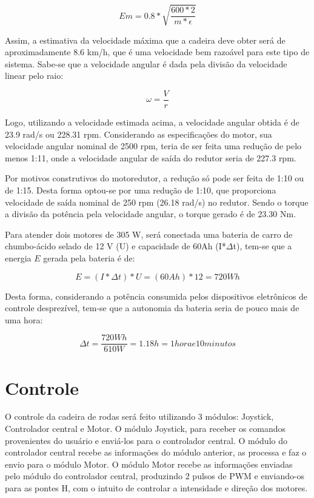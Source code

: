   \begin{equation}
  Em = 0.8*\sqrt{\frac{600*2}{m*\epsilon}}
  \end{equation}

  Assim, a estimativa da velocidade máxima que a cadeira deve obter será de aproximadamente 8.6 km/h, que é uma velocidade bem razoável para este tipo de sistema. Sabe-se que a velocidade angular é dada pela divisão da velocidade linear pelo raio:

  \begin{equation}
  \omega = \frac{V}{r}
  \end{equation}

  Logo, utilizando a velocidade estimada acima, a velocidade angular obtida é de 23.9 rad/s ou 228.31 rpm. Considerando as especificações do motor, sua velocidade angular nominal de 2500 rpm, teria de ser feita uma redução de pelo menos 1:11, onde a velocidade angular de saída do redutor seria de 227.3 rpm.

  Por motivos construtivos do motoredutor, a redução só pode ser feita de 1:10 ou de 1:15. Desta forma optou-se por uma redução de 1:10, que proporciona velocidade de saída nominal de 250 rpm (26.18 rad/s) no redutor. Sendo o torque a divisão da potência pela velocidade angular, o torque gerado é de 23.30 Nm.

  Para atender dois motores de 305 W, será conectada uma bateria de carro de chumbo-ácido selado de 12 V (U) e capacidade de 60Ah (I*$\Delta$t), tem-se que a energia $E$ gerada pela bateria é de:

  \begin{equation}
  E = (I*\Delta t)*U = (60Ah)*12 = 720Wh
  \end{equation}

  Desta forma, considerando a potência consumida pelos dispositivos eletrônicos de controle desprezível, tem-se que a autonomia da bateria seria de pouco mais de uma hora:

  \begin{equation}
  \Delta t = \frac{720 Wh}{610 W} = 1.18 h = 1 hora e 10 minutos
  \end{equation}

\section{Controle}

  O controle da cadeira de rodas será feito utilizando 3 módulos: Joystick, Controlador central e Motor.
  O módulo Joystick, para receber os comandos provenientes do usuário e enviá-los para o controlador central. O módulo do controlador central recebe as informações do módulo anterior, as processa e faz o envio para o módulo Motor. O módulo Motor recebe as informações enviadas pelo módulo do controlador central, produzindo 2 pulsos de PWM e enviando-os para as pontes H, com o intuito de controlar a intensidade e direção dos motores.

